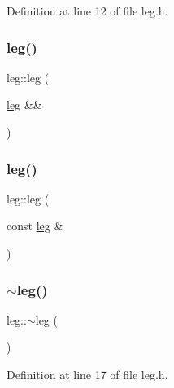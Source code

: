 Definition at line 12 of file leg.\+h.

\mbox{\label{classleg_a880c3eda57ee576b1c091e09c8679096}} 
\subsubsection{\texorpdfstring{leg()}{leg()}\hspace{0.1cm}{\footnotesize\ttfamily [2/3]}}
{\footnotesize\ttfamily leg\+::leg (\begin{DoxyParamCaption}\item[{\mbox{\hyperlink{classleg}{leg}} \&\&}]{ }\end{DoxyParamCaption})\hspace{0.3cm}{\ttfamily [default]}}

\mbox{\label{classleg_a855f8b6bb7b32343290bddf9b7af2ab1}} 
\subsubsection{\texorpdfstring{leg()}{leg()}\hspace{0.1cm}{\footnotesize\ttfamily [3/3]}}
{\footnotesize\ttfamily leg\+::leg (\begin{DoxyParamCaption}\item[{const \mbox{\hyperlink{classleg}{leg}} \&}]{ }\end{DoxyParamCaption})\hspace{0.3cm}{\ttfamily [default]}}

\mbox{\label{classleg_abdce802c51dbf118f404973d796dd2d3}} 
\subsubsection{\texorpdfstring{$\sim$leg()}{~leg()}}
{\footnotesize\ttfamily leg\+::$\sim$leg (\begin{DoxyParamCaption}{ }\end{DoxyParamCaption})\hspace{0.3cm}{\ttfamily [inline]}}



Definition at line 17 of file leg.\+h.



